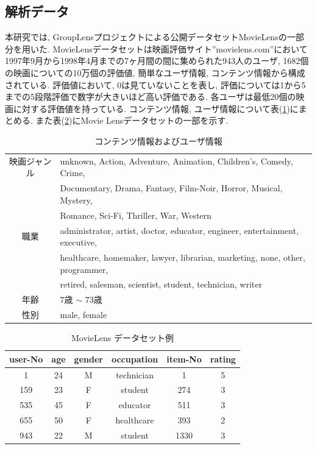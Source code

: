 \documentclass[a4j,12pt]{jarticle}
\begin{document}
\subsection{解析データ}

本研究では, GroupLensプロジェクトによる公開データセットMovieLensの一部分を用いた. MovieLensデータセットは映画評価サイト''movielens.com''において1997年9月から1998年4月までの7ヶ月間の間に集められた943人のユーザ, 1682個の映画についての10万個の評価値, 簡単なユーザ情報, コンテンツ情報から構成されている. 評価値において, $0$は見ていないことを表し, 評価については1から5までの5段階評価で数字が大きいほど高い評価である. 各ユーザは最低20個の映画に対する評価値を持っている. コンテンツ情報, ユーザ情報について表(\ref{MovieLens1})にまとめる. また表(\ref{MovieLens2})にMovie Lensデータセットの一部を示す.

\begin{table}[tbp]
\begin{center}
\caption{コンテンツ情報およびユーザ情報}   %
\label{MovieLens1}   %
\begin{tabular}{c l}
\hline
映画ジャンル & unknown, Action, Adventure, Animation, Children's, Comedy, Crime, \\
                 & Documentary, Drama, Fantasy, Film-Noir, Horror, Musical, Mystery, \\
                 & Romance, Sci-Fi, Thriller, War, Western \\
職業          & administrator, artist, doctor, educator, engineer, entertainment, executive, \\
                & healthcare, homemaker, lawyer, librarian, marketing, none, other, programmer, \\
                & retired, salesman, scientist, student, technician, writer \\
年齢 & 7歳 $\sim$ 73歳 \\
性別 & male, female\\ 
\hline
\end{tabular}
\end{center}
\end{table}

\begin{table}[tbp]
\begin{center}
\caption{MovieLens データセット例}   %
\label{MovieLens2}   %
\begin{tabular}{c c c c c c}
\hline
user-No	&	age	&	gender	&	occupation	&	item-No	& rating \\ \hline \hline
1	&	24	&	M	&	technician	&  1  & 5 \\	\hline
159	&    23	&     F	&      student	      &  274 & 3 \\	\hline
535	&	45	&	F	&	educator	&	511	& 3 \\ \hline
655	&	50	&	F	&	healthcare	& 393 & 2 \\	\hline
943	&	22	&	M	&	student	&	1330 & 3 \\  \hline
\end{tabular}
\end{center}
\end{table}
\end{document}
